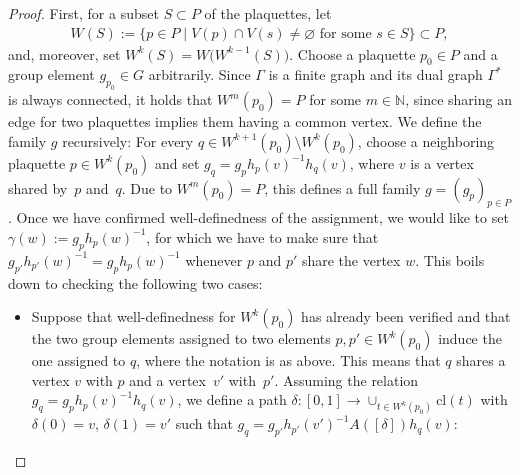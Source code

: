 \documentclass[10pt,a4paper]{amsart}
\numberwithin{equation}{section}
\theoremstyle{definition}
\begin{document}
\begin{proof}
First, for a subset $S \subset P$ of the plaquettes, let
\begin{align*}
 W(S) := \{p \in P \mid V(p) \cap V(s) \neq \varnothing \text{ for some }s \in S\} \subset P,
\end{align*}
and, moreover, set $W^k(S) = W\bigl(W^{k-1}(S)\bigr)$. Choose a plaquette $p_0 \in P$ and a group element $g_{p_0} \in G$ arbitrarily. Since $\Gamma$ is a finite graph and its dual graph $\Gamma^*$ is always connected, it holds that $W^m(p_0) = P$ for some $m \in \mathbb{N}$, since sharing an edge for two plaquettes implies them having a common vertex. We define the family $g$ recursively: For every $q \in W^{k+1}(p_0) \setminus W^k(p_0)$, choose a neighboring plaquette $p \in W^k(p_0)$ and set $g_{q} = g_ph_p(v)^{-1}h_{q}(v)$, where $v$ is a vertex shared by~$p$ and~$q$. Due to $W^m(p_0) = P$, this defines a full family $g = (g_p)_{p \in P}$. Once we have confirmed well-definedness of the assignment, we would like to set $\gamma(w) := g_ph_p(w)^{-1}$, for which we have to make sure that $g_{p'}h_{p'}(w)^{-1} = g_ph_p(w)^{-1}$ whenever $p$ and $p'$ share the vertex $w$. This boils down to checking the following two cases:
\begin{itemize}\itemsep=0pt
 \item Suppose that well-definedness for $W^k(p_0)$ has already been verified and that the two group elements assigned to two elements $p, p' \in W^k(p_0)$ induce the one assigned to $q$, where the notation is as above. This means that $q$ shares a vertex $v$ with $p$ and a vertex~$v'$ with~$p'$. Assuming the relation $g_q = g_ph_p(v)^{-1}h_q(v)$, we define a path $\delta\colon [0,1] \rightarrow \cup_{t \in {W^k}(p_0)}\mathrm{cl}(t)$ with $\delta(0) = v$, $\delta(1) = v'$ such that $g_{q} = g_{p'}h_{p'}(v')^{-1}A([\delta])h_{q}(v)$:


\end{itemize}
\end{proof}
\end{document}
